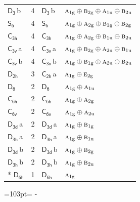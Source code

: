 \documentclass[10pt,a4paper]{article}
\newcommand{\needspace}[1]{\par\penalty-100\begingroup\dimen0=#1\relax\dimen2=\pagegoal
  \advance\dimen2-\pagetotal\ifdim\dimen0>\dimen2\relax\ifdim\dimen2>0pt\vfil\break\fi\fi
  \endgroup}
\numberwithin{equation}{section}
\newcommand{\grp}[1]{\mathsf{#1}}
\newcommand{\irr}[1]{\text{\normalfont\scshape #1}}
\newcommand{\ptag}[1]{\mathrm{#1}}
\newcommand{\clsletter}[1]{\,{\scriptsize\color{black!55}#1}}
\newlength{\fillwidth}\newlength{\cellwidth}\newlength{\colwidth}
\begin{document}
{\begin{longtable}{@{}lrl>{\RaggedRight\arraybackslash}p{\fillwidth}@{}}
\href{D3.pdf}{$\grp{D_{3}}$}\clsletter{b} & 4 & \href{D3.pdf}{$\grp{D_{3}}$}\clsletter{b} & $\irr{a}_{1\ptag{g}}\oplus \irr{b}_{2\ptag{g}}\oplus \irr{a}_{1\ptag{u}}\oplus \irr{b}_{2\ptag{u}}$\\
\href{S6.pdf}{$\grp{S_{6}}$} & 4 & \href{S6.pdf}{$\grp{S_{6}}$} & $\irr{a}_{1\ptag{g}}\oplus \irr{a}_{2\ptag{g}}\oplus \irr{b}_{1\ptag{g}}\oplus \irr{b}_{2\ptag{g}}$\\
\href{C3h.pdf}{$\grp{C_{3h}}$} & 4 & \href{C3h.pdf}{$\grp{C_{3h}}$} & $\irr{a}_{1\ptag{g}}\oplus \irr{a}_{2\ptag{g}}\oplus \irr{b}_{1\ptag{u}}\oplus \irr{b}_{2\ptag{u}}$\\
\href{C3v.pdf}{$\grp{C_{3v}}$}\clsletter{a} & 4 & \href{C3v.pdf}{$\grp{C_{3v}}$}\clsletter{a} & $\irr{a}_{1\ptag{g}}\oplus \irr{b}_{2\ptag{g}}\oplus \irr{a}_{2\ptag{u}}\oplus \irr{b}_{1\ptag{u}}$\\
\href{C3v.pdf}{$\grp{C_{3v}}$}\clsletter{b} & 4 & \href{C3v.pdf}{$\grp{C_{3v}}$}\clsletter{b} & $\irr{a}_{1\ptag{g}}\oplus \irr{b}_{1\ptag{g}}\oplus \irr{a}_{2\ptag{u}}\oplus \irr{b}_{2\ptag{u}}$\\
\href{D2h.pdf}{$\grp{D_{2h}}$} & 3 & \href{C2h.pdf}{$\grp{C_{2h}}$}\clsletter{a} & $\irr{a}_{1\ptag{g}}\oplus \irr{e}_{2\ptag{g}}$\\
\href{D6.pdf}{$\grp{D_{6}}$} & 2 & \href{D6.pdf}{$\grp{D_{6}}$} & $\irr{a}_{1\ptag{g}}\oplus \irr{a}_{1\ptag{u}}$\\
\href{C6h.pdf}{$\grp{C_{6h}}$} & 2 & \href{C6h.pdf}{$\grp{C_{6h}}$} & $\irr{a}_{1\ptag{g}}\oplus \irr{a}_{2\ptag{g}}$\\
\href{C6v.pdf}{$\grp{C_{6v}}$} & 2 & \href{C6v.pdf}{$\grp{C_{6v}}$} & $\irr{a}_{1\ptag{g}}\oplus \irr{a}_{2\ptag{u}}$\\
\href{D3d.pdf}{$\grp{D_{3d}}$}\clsletter{a} & 2 & \href{D3d.pdf}{$\grp{D_{3d}}$}\clsletter{a} & $\irr{a}_{1\ptag{g}}\oplus \irr{b}_{1\ptag{g}}$\\
\href{D3h.pdf}{$\grp{D_{3h}}$}\clsletter{a} & 2 & \href{D3h.pdf}{$\grp{D_{3h}}$}\clsletter{a} & $\irr{a}_{1\ptag{g}}\oplus \irr{b}_{1\ptag{u}}$\\
\href{D3d.pdf}{$\grp{D_{3d}}$}\clsletter{b} & 2 & \href{D3d.pdf}{$\grp{D_{3d}}$}\clsletter{b} & $\irr{a}_{1\ptag{g}}\oplus \irr{b}_{2\ptag{g}}$\\
\href{D3h.pdf}{$\grp{D_{3h}}$}\clsletter{b} & 2 & \href{D3h.pdf}{$\grp{D_{3h}}$}\clsletter{b} & $\irr{a}_{1\ptag{g}}\oplus \irr{b}_{2\ptag{u}}$\\*
\href{D6h.pdf}{$\grp{D_{6h}}$} & 1 & \href{D6h.pdf}{$\grp{D_{6h}}$} & $\irr{a}_{1\ptag{g}}$\\
\bottomrule\end{longtable}}
\needspace{103pt}
\end{document}
